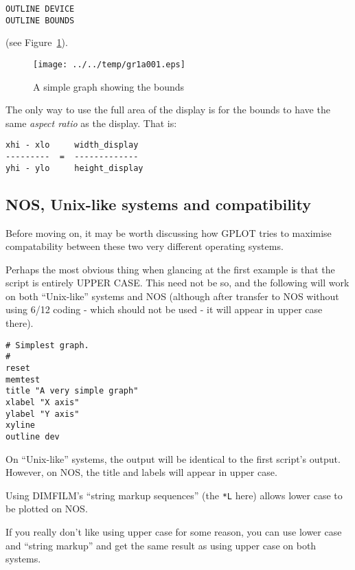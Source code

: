 \documentclass[a4paper,twoside,11pt]{article}
\makeatletter
\def\maxwidth{%
  \ifdim\Gin@nat@width>\linewidth
    \linewidth
  \else
    \Gin@nat@width
  \fi
}
\newcommand{\newpara}{\par\vspace{4mm}\noindent}
\makeatother
\begin{document}
\begin{lstlisting}
OUTLINE DEVICE
OUTLINE BOUNDS
\end{lstlisting}

\newpara
(see Figure~\ref{fig:gr1a001}).

\begin{figure}
  \centering
  \texttt{[image: ../../temp/gr1a001.eps]}
  \caption{A simple graph showing the bounds}
  \label{fig:gr1a001}
\end{figure}

\newpara
The only way to use the full area of the display is for the bounds to
have the same \emph{aspect ratio} as the display. That is:

\begin{lstlisting}
xhi - xlo     width_display
---------  =  -------------
yhi - ylo     height_display
\end{lstlisting}

\subsection{NOS, Unix-like systems and compatibility}\label{nos-unix-like-systems-and-compatibility}
\newpara
Before moving on, it may be worth discussing how GPLOT tries to maximise
compatability between these two very different operating systems.

\newpara
Perhaps the most obvious thing when glancing at the first example is
that the script is entirely UPPER CASE. This need not be so, and the
following will work on both ``Unix-like'' systems and NOS (although
after transfer to NOS without using 6/12 coding - which should not be
used - it will appear in upper case there).

\begin{lstlisting}
# Simplest graph.
#
reset
memtest
title "A very simple graph"
xlabel "X axis"
ylabel "Y axis"
xyline
outline dev
\end{lstlisting}

\newpara
On ``Unix-like'' systems, the output will be identical to the first
script's output. However, on NOS, the title and labels will appear in
upper case.

\newpara
Using DIMFILM's ``string markup sequences'' (the \texttt{*L} here)
allows lower case to be plotted on NOS.

\newpara
If you really don't like using upper case for some reason, you can use
lower case and ``string markup'' and get the same result as using upper
case on both systems.
\end{document}

